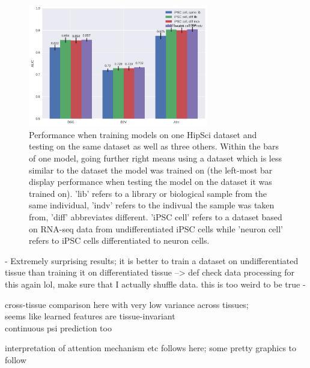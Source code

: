 \begin{figure}
	\centering\includegraphics[width=0.7\textwidth]{../visualizations/ch5-results/majiq_comparison_barcharts.png} 
	\caption{Performance when training models on one HipSci dataset and testing on the same dataset as well as three others. Within the bars of one model, going further right means using a dataset which is less similar to the dataset the model was trained on (the left-most bar display performance when testing the model on the dataset it was trained on). 'lib' refers to a library or biological sample from the same individual, 'indv' refers to the indivual the sample was taken from, 'diff' abbreviates different. 'iPSC cell' refers to a dataset based on RNA-seq data from undifferentiated iPSC cells while 'neuron cell' refers to iPSC cells differentiated to neuron cells. }
	\label{fig:majiq_comparison_barcharts}
\end{figure}

- Extremely surprising results; it is better to train a dataset on undifferentiated tissue than training it on differentiated tissue --> def check data processing for this again lol, make sure that I actually shuffle data. this is too weird to be true
- 

cross-tissue comparison here with very low variance across tissues;\\
seems like learned features are tissue-invariant\\

continuous psi prediction too



interpretation of attention mechanism etc follows here; some pretty graphics to follow
